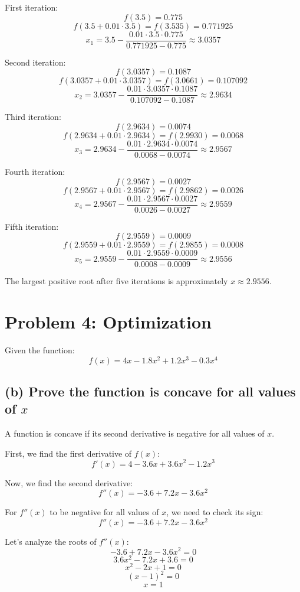 \documentclass[12pt]{article}
\begin{document}
First iteration:
\[
f(3.5) = 0.775
\]
\[
f(3.5 + 0.01 \cdot 3.5) = f(3.535) = 0.771925
\]
\[
x_1 = 3.5 - \frac{0.01 \cdot 3.5 \cdot 0.775}{0.771925 - 0.775} \approx 3.0357
\]

Second iteration:
\[
f(3.0357) = 0.1087
\]
\[
f(3.0357 + 0.01 \cdot 3.0357) = f(3.0661) = 0.107092
\]
\[
x_2 = 3.0357 - \frac{0.01 \cdot 3.0357 \cdot 0.1087}{0.107092 - 0.1087} \approx 2.9634
\]

Third iteration:
\[
f(2.9634) = 0.0074
\]
\[
f(2.9634 + 0.01 \cdot 2.9634) = f(2.9930) = 0.0068
\]
\[
x_3 = 2.9634 - \frac{0.01 \cdot 2.9634 \cdot 0.0074}{0.0068 - 0.0074} \approx 2.9567
\]

Fourth iteration:
\[
f(2.9567) = 0.0027
\]
\[
f(2.9567 + 0.01 \cdot 2.9567) = f(2.9862) = 0.0026
\]
\[
x_4 = 2.9567 - \frac{0.01 \cdot 2.9567 \cdot 0.0027}{0.0026 - 0.0027} \approx 2.9559
\]

Fifth iteration:
\[
f(2.9559) = 0.0009
\]
\[
f(2.9559 + 0.01 \cdot 2.9559) = f(2.9855) = 0.0008
\]
\[
x_5 = 2.9559 - \frac{0.01 \cdot 2.9559 \cdot 0.0009}{0.0008 - 0.0009} \approx 2.9556
\]

The largest positive root after five iterations is approximately \(x \approx 2.9556\).

\section*{Problem 4: Optimization}

Given the function:
\[
f(x) = 4x - 1.8x^2 + 1.2x^3 - 0.3x^4
\]

\subsection*{(b) Prove the function is concave for all values of \(x\)}

A function is concave if its second derivative is negative for all values of \(x\).

First, we find the first derivative of \(f(x)\):
\[
f'(x) = 4 - 3.6x + 3.6x^2 - 1.2x^3
\]

Now, we find the second derivative:
\[
f''(x) = -3.6 + 7.2x - 3.6x^2
\]

For \(f''(x)\) to be negative for all values of \(x\), we need to check its sign:
\[
f''(x) = -3.6 + 7.2x - 3.6x^2
\]

Let's analyze the roots of \(f''(x)\):
\[
-3.6 + 7.2x - 3.6x^2 = 0
\]
\[
3.6x^2 - 7.2x + 3.6 = 0
\]
\[
x^2 - 2x + 1 = 0
\]
\[
(x - 1)^2 = 0
\]
\[
x = 1
\]
\end{document}

